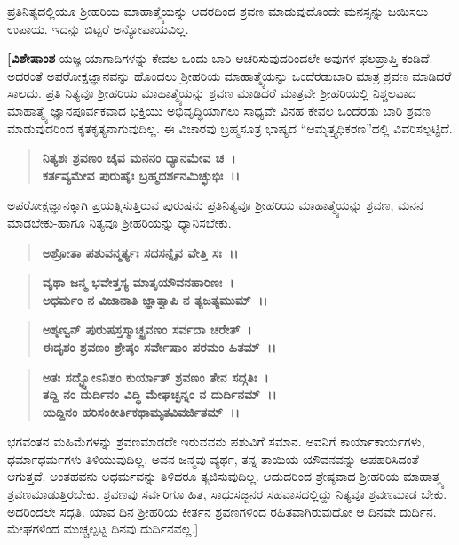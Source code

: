 ಪ್ರತಿನಿತ್ಯದಲ್ಲಿಯೂ ಶ‍್ರೀಹರಿಯ ಮಾಹಾತ್ಮ್ಯೆಯನ್ನು ಆದರದಿಂದ ಶ್ರವಣ ಮಾಡುವುದೊಂದೇ ಮನಸ್ಸನ್ನು ಜಯಿಸಲು ಉಪಾಯ. ಇದನ್ನು ಬಿಟ್ಟರೆ ಅನ್ಯೋಪಾಯವಿಲ್ಲ.

\textbf{[ವಿಶೇಷಾಂಶ\enginline{-}} ಯಜ್ಞ ಯಾಗಾದಿಗಳನ್ನು ಕೇವಲ ಒಂದು ಬಾರಿ ಆಚರಿಸುವುದರಿಂದಲೇ ಅವುಗಳ ಫಲಪ್ರಾಪ್ತಿ ಕಂಡಿದೆ. ಅದರಂತೆ ಅಪರೋಕ್ಷಜ್ಞಾನವನ್ನು ಹೊಂದಲು ಶ‍್ರೀಹರಿಯ ಮಾಹಾತ್ಮ್ಯೆಯನ್ನು ಒಂದೆರಡುಬಾರಿ ಮಾತ್ರ ಶ್ರವಣ ಮಾಡಿದರೆ ಸಾಲದು. ಪ್ರತಿ ನಿತ್ಯವೂ ಶ‍್ರೀಹರಿಯ ಮಾಹಾತ್ಮ್ಯೆಯನ್ನು ಶ್ರವಣ ಮಾಡಿದರೆ ಮಾತ್ರವೇ ಶ‍್ರೀಹರಿಯಲ್ಲಿ ನಿಶ್ಚಲವಾದ ಮಾಹಾತ್ಮ್ಯೆ ಜ್ಞಾನಪೂರ್ವಕವಾದ ಭಕ್ತಿಯು ಅಭಿವೃದ್ಧಿಯಾಗಲು ಸಾಧ್ಯವೇ ವಿನಹ ಕೇವಲ ಒಂದೆರಡು ಬಾರಿ ಶ್ರವಣ ಮಾಡುವುದರಿಂದ ಕೃತಕೃತ್ಯನಾಗುವುದಿಲ್ಲ. ಈ ವಿಚಾರವು ಬ್ರಹ್ಮಸೂತ್ರ ಭಾಷ್ಯದ “ಆಮೃತ್ತ್ಯಧಿಕರಣ”ದಲ್ಲಿ ವಿವರಿಸಲ್ಪಟ್ಟಿದೆ.

\begin{verse}
\textbf{ನಿತ್ಯಶಃ ಶ್ರವಣಂ ಚೈವ ಮನನಂ ಧ್ಯಾನಮೇವ ಚ~।}\\\textbf{ಕರ್ತವ್ಯಮೇವ ಪುರುಷೈಃ ಬ್ರಹ್ಮದರ್ಶನಮಿಚ್ಛುಭಿಃ~।।} 
\end{verse}

ಅಪರೋಕ್ಷಜ್ಞಾನಕ್ಕಾಗಿ ಪ್ರಯತ್ನಿಸುತ್ತಿರುವ ಪುರುಷನು ಪ್ರತಿನಿತ್ಯವೂ ಶ‍್ರೀಹರಿಯ ಮಾಹಾತ್ಮ್ಯೆಯನ್ನು ಶ್ರವಣ, ಮನನ ಮಾಡಬೇಕು-ಹಾಗೂ ನಿತ್ಯವೂ ಶ‍್ರೀಹರಿಯನ್ನು ಧ್ಯಾನಿಸಬೇಕು.

\newpage

\begin{verse}
\textbf{ಅಶ್ರೋತಾ ಪಶುವನ್ಮರ್ತ್ಯಃ ಸದಸನ್ನೈವ ವೇತ್ತಿ ಸಃ~।।} 
\end{verse}

\begin{verse}
\textbf{ವೃಥಾ ಜನ್ಮ ಭವೇತ್ತಸ್ಯ ಮಾತೃಯೌವನಹಾರಿಣಃ~।}\\\textbf{ಅಧರ್ಮಂ ನ ವಿಜಾನಾತಿ ಜ್ಞಾತ್ವಾಪಿ ನ ತ್ಯಜತ್ಯಮುಮ್~।। }
\end{verse}

\begin{verse}
\textbf{ಅಶೃಣ್ವನ್ ಪುರುಷಸ್ತಸ್ಮಾಚ್ಛ್ರವಣಂ ಸರ್ವದಾ ಚರೇತ್~।}\\\textbf{ಈದೃಶಂ ಶ್ರವಣಂ ಶ್ರೇಷ್ಠಂ ಸರ್ವೇಷಾಂ ಪರಮಂ ಹಿತಮ್~।। }
\end{verse}

\begin{verse}
\textbf{ಅತಃ ಸದ್ಭ್ಯೋಽನಿಶಂ ಕುರ್ಯಾತ್ ಶ್ರವಣಂ ತೇನ ಸದ್ಗತಿಃ~।}\\\textbf{ತದ್ದಿ ನಂ ದುರ್ದಿನಂ ವಿದ್ಧಿ ಮೇಘಚ್ಛನ್ನಂ ನ ದುರ್ದಿನಮ್~।। }\\\textbf{ಯದ್ದಿನಂ ಹರಿಸಂಕೀರ್ತಿಕಥಾಮೃತವಿವರ್ಜಿತಮ್~।।} 
\end{verse}

ಭಗವಂತನ ಮಹಿಮೆಗಳನ್ನು ಶ್ರವಣಮಾಡದೇ ಇರುವವನು ಪಶುವಿಗೆ ಸಮಾನ. ಅವನಿಗೆ ಕಾರ್ಯಾಕಾರ್ಯಗಳು, ಧರ್ಮಾಧರ್ಮಗಳು ತಿಳಿಯುವುದಿಲ್ಲ. ಅವನ ಜನ್ಮವು ವ್ಯರ್ಥ, ತನ್ನ ತಾಯಿಯ ಯೌವನವನ್ನು ಅಪಹರಿಸಿದಂತೆ ಆಗುತ್ತದೆ. ಅಂತಹವನು ಅಧರ್ಮವನ್ನು ತಿಳಿದರೂ ತ್ಯಜಿಸುವುದಿಲ್ಲ. ಆದುದರಿಂದ ಶ್ರೇಷ್ಠವಾದ ಶ‍್ರೀಹರಿಯ ಮಾಹಾತ್ಮ್ಯ ಶ್ರವಣಮಾಡುತ್ತಿರಬೇಕು. ಶ್ರವಣವು ಸರ್ವರಿಗೂ ಹಿತ, ಸಾಧುಸಜ್ಜನರ ಸಹವಾಸದಲ್ಲಿದ್ದು ನಿತ್ಯವೂ ಶ್ರವಣಮಾಡ ಬೇಕು. ಅದರಿಂದಲೇ ಸದ್ಗತಿ. ಯಾವ ದಿನ ಶ‍್ರೀಹರಿಯ ಕೀರ್ತನ ಶ್ರವಣಗಳಿಂದ ರಹಿತವಾಗಿರುವುದೋ ಆ ದಿನವೇ ದುರ್ದಿನ. ಮೇಘಗಳಿಂದ ಮುಚ್ಚಲ್ಪಟ್ಟ ದಿನವು ದುರ್ದಿನವಲ್ಲ.]

